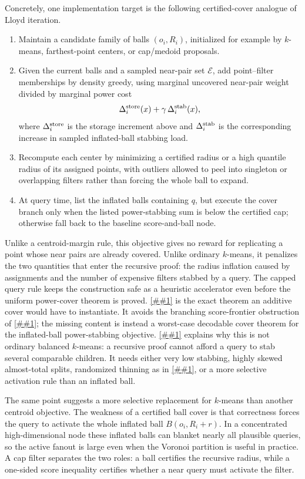 \documentclass[10pt]{article}
\newcommand{\cref}[1]{\ref{##1}}
\newcommand{\Cref}[1]{\ref{##1}}
\theoremstyle{definition}
\begin{document}
Concretely, one implementation target is the following certified-cover
analogue of Lloyd iteration.
\begin{enumerate}
   \item Maintain a candidate family of balls $(o_i,R_i)$, initialized for
   example by $k$-means, farthest-point centers, or cap/medoid proposals.
   \item Given the current balls and a sampled near-pair set $\mathcal E$, add
   point--filter memberships by density greedy, using marginal uncovered
   near-pair weight divided by marginal power cost
   \[
      \Delta_i^{\rm store}(x)
      +
      \gamma\,\Delta_i^{\rm stab}(x),
   \]
   where $\Delta_i^{\rm store}$ is the storage increment above and
   $\Delta_i^{\rm stab}$ is the corresponding increase in sampled inflated-ball
   stabbing load.
   \item Recompute each center by minimizing a certified radius or a high
   quantile radius of its assigned points, with outliers allowed to peel into
   singleton or overlapping filters rather than forcing the whole ball to
   expand.
   \item At query time, list the inflated balls containing $q$, but execute the
   cover branch only when the listed power-stabbing sum is below the certified
   cap; otherwise fall back to the baseline score-and-ball node.
\end{enumerate}
Unlike a centroid-margin rule, this objective gives no reward for replicating a
point whose near pairs are already covered. Unlike ordinary $k$-means, it
penalizes the two quantities that enter the recursive proof: the radius
inflation caused by assignments and the number of expensive filters stabbed by
a query. The capped query rule keeps the construction safe as a heuristic
accelerator even before the uniform power-cover theorem is proved.
\Cref{prop:power-cover-polylog} is the exact theorem an additive cover would
have to instantiate. It avoids the branching score-frontier obstruction of
\cref{asm:mixed-continuation-operator}; the missing content is instead a
worst-case decodable cover theorem for the inflated-ball power-stabbing
objective. \Cref{lem:balanced-fanout-obstruction} explains why this is not
ordinary balanced $k$-means: a recursive proof cannot afford a query to stab
several comparable children. It needs either very low stabbing, highly skewed
almost-total splits, randomized thinning as in
\cref{lem:thin-cap-contraction}, or a more selective activation rule than an
inflated ball.

The same point suggests a more selective replacement for $k$-means than another
centroid objective.  The weakness of a certified ball cover is that correctness
forces the query to activate the whole inflated ball $B(o_i,R_i+r)$.  In a
concentrated high-dimensional node these inflated balls can blanket nearly all
plausible queries, so the active fanout is large even when the Voronoi
partition is useful in practice.  A cap filter separates the two roles: a ball
certifies the recursive radius, while a one-sided score inequality certifies
whether a near query must activate the filter.
\end{document}
